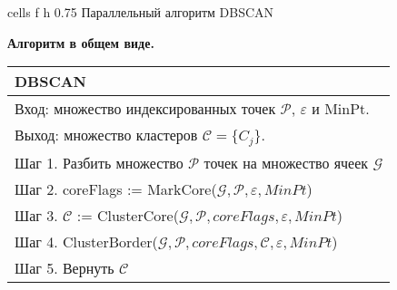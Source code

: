 {cells} %
{f} %
{h} %
{0.75\textwidth} %
{Параллельный алгоритм DBSCAN} %

\clearpage

\textbf{Алгоритм в общем виде.}
\begin{table}[h!]
        \begin{threeparttable}
            \captionsetup{justification=raggedleft,singlelinecheck=off}
            \begin{tabular}{p{16cm}}
                \hline
                DBSCAN \\
                \hline
                Вход: множество индексированных точек \(\mathcal{P}\), \(\varepsilon\) и MinPt. \\
                Выход: множество кластеров \(\mathcal{C} = \{C_j\}\).\\
                Шаг 1. Разбить множество \(\mathcal{P}\) точек на множество ячеек \(\mathcal{G}\)\\
                Шаг 2. coreFlags := MarkCore(\(\mathcal{G}, \mathcal{P}, \varepsilon, MinPt\))\\
                Шаг 3. \(\mathcal{C}\) := ClusterCore(\(\mathcal{G}, \mathcal{P}, coreFlags, \varepsilon, MinPt\))\\
                Шаг 4. ClusterBorder(\(\mathcal{G}, \mathcal{P}, coreFlags, \mathcal{C}, \varepsilon, MinPt\))\\
                Шаг 5. Вернуть \(\mathcal{C}\) \\
                \hline
            \end{tabular}
        \end{threeparttable}
\end{table}

